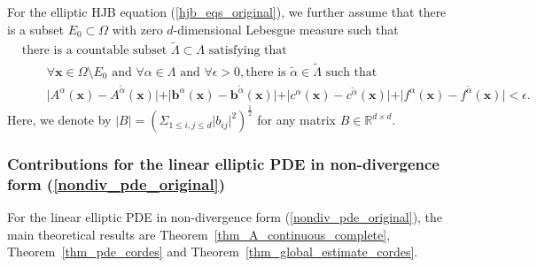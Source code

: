 \documentclass[12pt]{amsart}
\newcommand{\boldx}{\boldsymbol{x}}
\theoremstyle{definition}
\theoremstyle{remark}
\begin{document}
For the elliptic HJB equation (\ref{hjb_eqs_original}), we further assume that there is a subset 
$E_{0} \subset \Omega$ with zero $d$-dimensional Lebesgue measure such that 
\begin{align}
\label{hjb_coeffs_alternatives} 
& \text{there is a countable subset } \tilde{\Lambda}\subset \Lambda \text{ satisfying that}\\
\nonumber 
& \qquad \forall \boldx \in \Omega \setminus E_{0} \text{ and } \forall 
\alpha \in \Lambda \text{ and } \forall \epsilon > 0, \text{there is } 
\tilde{\alpha} \in \tilde{\Lambda} \text{ such that} \\
\nonumber 
& \qquad \vert A^{\alpha}(\boldx) - A^{\tilde{\alpha}}(\boldx)\vert 
+ \vert \boldsymbol{b}^{\alpha}(\boldx) - \boldsymbol{b}^{\tilde{\alpha}}
(\boldx) \vert + \vert c^{\alpha}(\boldx) - c^{\tilde{\alpha}}(\boldx) \vert 
+ \vert f^{\alpha}(\boldx) - f^{\tilde{\alpha}}(\boldx) \vert < \epsilon.
\end{align}
Here, we denote by $\vert B \vert= \left( \Sigma_{1\leq i, j \leq d} \vert b_{ij} \vert^{2} \right)^{\frac{1}{2}}$ 
for any matrix $B \in \mathbb{R}^{d\times d}$. 

\subsubsection{Contributions for the linear elliptic PDE in non-divergence form (\ref{nondiv_pde_original})}

For the linear elliptic PDE in non-divergence form (\ref{nondiv_pde_original}), 
the main theoretical results are Theorem~\ref{thm_A_continuous_complete}, 
Theorem~\ref{thm_pde_cordes} and Theorem~\ref{thm_global_estimate_cordes}. 
\end{document}
